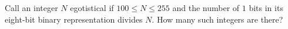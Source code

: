 Call an integer $N$ egotistical if $100\le N\le255$ and the number of $1$ bits in its eight-bit binary representation divides $N$. How many such integers are there?
